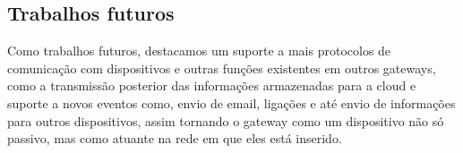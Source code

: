 \subsection{Trabalhos futuros}
\label{trabalhosFuturos}

Como trabalhos futuros, destacamos um suporte a mais protocolos de comunicação com dispositivos e outras funções existentes em outros gateways, como a transmissão posterior das informações armazenadas para a cloud e suporte a novos eventos como, envio de email, ligações e até envio de informações para outros dispositivos, assim tornando o gateway como um dispositivo não só passivo, mas como atuante na rede em que eles está inserido.





